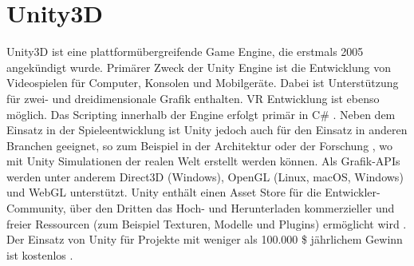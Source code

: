 

\section{Unity3D}
Unity3D ist eine plattformübergreifende Game Engine, die erstmals 2005 angekündigt wurde.
Primärer Zweck der Unity Engine ist die Entwicklung von Videospielen für Computer, Konsolen und Mobilgeräte.
Dabei ist Unterstützung für zwei- und dreidimensionale Grafik enthalten.
VR Entwicklung ist ebenso möglich.
Das Scripting innerhalb der Engine erfolgt primär in C\# \cite{freecodecamp.unityIntroduction}.
Neben dem Einsatz in der Spieleentwicklung ist Unity jedoch auch für den Einsatz in anderen Branchen geeignet, so zum Beispiel in der Architektur oder der Forschung \cite[30]{waidner.2020}, wo mit Unity Simulationen der realen Welt erstellt werden können.
Als Grafik-APIs werden unter anderem Direct3D (Windows), OpenGL (Linux, macOS, Windows) und WebGL unterstützt.
Unity enthält einen Asset Store für die Entwickler-Community, über den Dritten das Hoch- und Herunterladen kommerzieller und freier Ressourcen (zum Beispiel Texturen, Modelle und Plugins) ermöglicht wird \cite{freecodecamp.unityIntroduction}.
Der Einsatz von Unity für Projekte mit weniger als 100.000 \$ jährlichem Gewinn ist kostenlos \cite{unityPersonal}.


